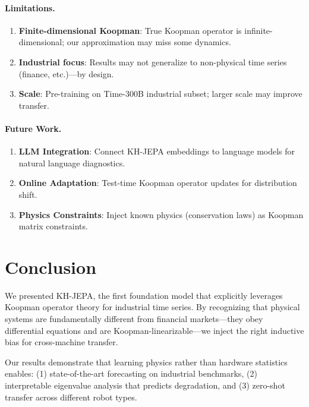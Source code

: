 \documentclass{article}
\begin{document}
\paragraph{Limitations.}
\begin{enumerate}
    \item \textbf{Finite-dimensional Koopman}: True Koopman operator is infinite-dimensional; our approximation may miss some dynamics.
    \item \textbf{Industrial focus}: Results may not generalize to non-physical time series (finance, etc.)—by design.
    \item \textbf{Scale}: Pre-training on Time-300B industrial subset; larger scale may improve transfer.
\end{enumerate}

\paragraph{Future Work.}
\begin{enumerate}
    \item \textbf{LLM Integration}: Connect KH-JEPA embeddings to language models for natural language diagnostics.
    \item \textbf{Online Adaptation}: Test-time Koopman operator updates for distribution shift.
    \item \textbf{Physics Constraints}: Inject known physics (conservation laws) as Koopman matrix constraints.
\end{enumerate}

\section{Conclusion}

We presented KH-JEPA, the first foundation model that explicitly leverages Koopman operator theory for industrial time series. By recognizing that physical systems are fundamentally different from financial markets—they obey differential equations and are Koopman-linearizable—we inject the right inductive bias for cross-machine transfer.

Our results demonstrate that learning physics rather than hardware statistics enables: (1) state-of-the-art forecasting on industrial benchmarks, (2) interpretable eigenvalue analysis that predicts degradation, and (3) zero-shot transfer across different robot types.
\end{document}
